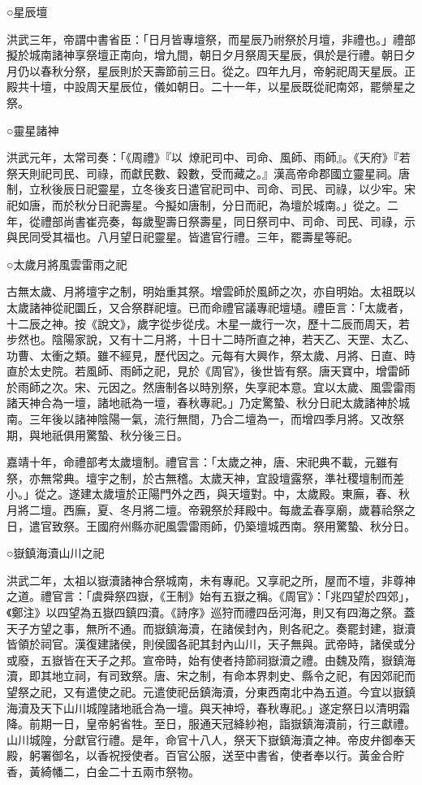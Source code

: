 ○星辰壇

洪武三年，帝謂中書省臣：「日月皆專壇祭，而星辰乃祔祭於月壇，非禮也。」禮部擬於城南諸神享祭壇正南向，增九間，朝日夕月祭周天星辰，俱於是行禮。朝日夕月仍以春秋分祭，星辰則於天壽節前三日。從之。四年九月，帝躬祀周天星辰。正殿共十壇，中設周天星辰位，儀如朝日。二十一年，以星辰既從祀南郊，罷禜星之祭。

○靈星諸神

洪武元年，太常司奏：「《周禮》『以燎祀司中、司命、風師、雨師』。《天府》『若祭天則祀司民、司祿，而獻民數、穀數，受而藏之。』漢高帝命郡國立靈星祠。唐制，立秋後辰日祀靈星，立冬後亥日遣官祀司中、司命、司民、司祿，以少牢。宋祀如唐，而於秋分日祀壽星。今擬如唐制，分日而祀，為壇於城南。」從之。二年，從禮部尚書崔亮奏，每歲聖壽日祭壽星，同日祭司中、司命、司民、司祿，示與民同受其福也。八月望日祀靈星。皆遣官行禮。三年，罷壽星等祀。

○太歲月將風雲雷雨之祀

古無太歲、月將壇宇之制，明始重其祭。增雲師於風師之次，亦自明始。太祖既以太歲諸神從祀圜丘，又合祭群祀壇。已而命禮官議專祀壇壝。禮臣言：「太歲者，十二辰之神。按《說文》，歲字從步從戌。木星一歲行一次，歷十二辰而周天，若步然也。陰陽家說，又有十二月將，十日十二時所直之神，若天乙、天罡、太乙、功曹、太衝之類。雖不經見，歷代因之。元每有大興作，祭太歲、月將、日直、時直於太史院。若風師、雨師之祀，見於《周官》，後世皆有祭。唐天寶中，增雷師於雨師之次。宋、元因之。然唐制各以時別祭，失享祀本意。宜以太歲、風雲雷雨諸天神合為一壇，諸地祇為一壇，春秋專祀。」乃定驚蟄、秋分日祀太歲諸神於城南。三年後以諸神陰陽一氣，流行無間，乃合二壇為一，而增四季月將。又改祭期，與地祇俱用驚蟄、秋分後三日。

嘉靖十年，命禮部考太歲壇制。禮官言：「太歲之神，唐、宋祀典不載，元雖有祭，亦無常典。壇宇之制，於古無稽。太歲天神，宜設壇露祭，準社稷壇制而差小。」從之。遂建太歲壇於正陽門外之西，與天壇對。中，太歲殿。東廡，春、秋月將二壇。西廡，夏、冬月將二壇。帝親祭於拜殿中。每歲孟春享廟，歲暮祫祭之日，遣官致祭。王國府州縣亦祀風雲雷雨師，仍築壇城西南。祭用驚蟄、秋分日。

○嶽鎮海瀆山川之祀

洪武二年，太祖以嶽瀆諸神合祭城南，未有專祀。又享祀之所，屋而不壇，非尊神之道。禮官言：「虞舜祭四嶽，《王制》始有五嶽之稱。《周官》：「兆四望於四郊」，《鄭注》以四望為五嶽四鎮四瀆。《詩序》巡狩而禮四岳河海，則又有四海之祭。蓋天子方望之事，無所不通。而嶽鎮海瀆，在諸侯封內，則各祀之。奏罷封建，嶽瀆皆領於祠官。漢復建諸侯，則侯國各祀其封內山川，天子無與。武帝時，諸侯或分或廢，五嶽皆在天子之邦。宣帝時，始有使者持節祠嶽瀆之禮。由魏及隋，嶽鎮海瀆，即其地立祠，有司致祭。唐、宋之制，有命本界刺史、縣令之祀，有因郊祀而望祭之祀，又有遣使之祀。元遣使祀岳鎮海瀆，分東西南北中為五道。今宜以嶽鎮海瀆及天下山川城隍諸地祇合為一壇。與天神埒，春秋專祀。」遂定祭日以清明霜降。前期一日，皇帝躬省牲。至日，服通天冠絳紗袍，詣嶽鎮海瀆前，行三獻禮。山川城隍，分獻官行禮。是年，命官十八人，祭天下嶽鎮海瀆之神。帝皮弁御奉天殿，躬署御名，以香祝授使者。百官公服，送至中書省，使者奉以行。黃金合貯香，黃綺幡二，白金二十五兩市祭物。

